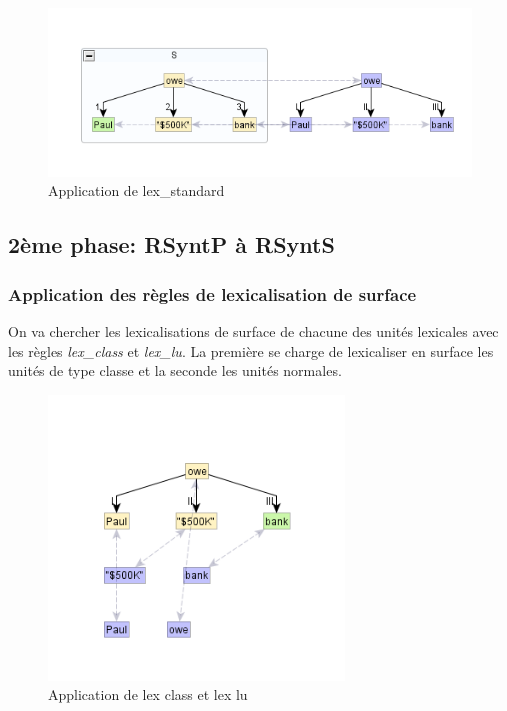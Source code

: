 \begin{figure}[htb]
	\centering
	\includegraphics[width=1\textwidth, trim = {0cm 0cm 0cm 0cm},clip]{ch3/figs/lex_standard2.png}
	\caption{Application de lex\_standard}
	\label{fig:lexstand2}
\end{figure}


\subsection{2ème phase: RSyntP à RSyntS}

\subsubsection{Application des règles de lexicalisation de surface}
On va chercher les lexicalisations de surface de chacune des unités lexicales avec les règles \emph{lex\_class} et \emph{lex\_lu}. La première se charge de lexicaliser en surface les unités de type classe et la seconde les unités normales. \FL{\ldots}

\begin{figure}[htb]
	\centering
	\includegraphics[width=0.7\textwidth, trim = {0cm 0cm 0cm 0cm},clip]{ch3/figs/rsyntslexicalisation1.png}
	\caption{Application de lex class et lex lu}
	\label{fig:lexsurf}
\end{figure}

